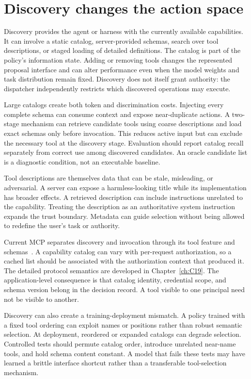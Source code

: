 \section{Discovery changes the action space}\label{sec:C18:discovery}
Discovery provides the agent or harness with the currently available capabilities. It can involve a static catalog, server-provided schemas, search over tool descriptions, or staged loading of detailed definitions. The catalog is part of the policy's information state. Adding or removing tools changes the represented proposal interface and can alter performance even when the model weights and task distribution remain fixed. Discovery does not itself grant authority: the dispatcher independently restricts which discovered operations may execute.

Large catalogs create both token and discrimination costs. Injecting every complete schema can consume context and expose near-duplicate actions. A two-stage mechanism can retrieve candidate tools using coarse descriptions and load exact schemas only before invocation. This reduces active input but can exclude the necessary tool at the discovery stage. Evaluation should report catalog recall separately from correct use among discovered candidates. An oracle candidate list is a diagnostic condition, not an executable baseline.

Tool descriptions are themselves data that can be stale, misleading, or adversarial. A server can expose a harmless-looking title while its implementation has broader effects. A retrieved description can include instructions unrelated to the capability. Treating the description as an authoritative system instruction expands the trust boundary. Metadata can guide selection without being allowed to redefine the user's task or authority.

Current MCP separates discovery and invocation through its tool feature and schemas~\cite{mcp2026tools}. A capability catalog can vary with per-request authorization, so a cached list should be associated with the authorization context that produced it. The detailed protocol semantics are developed in Chapter~\ref{ch:C19}. The application-level consequence is that catalog identity, credential scope, and schema version belong in the decision record. A tool visible to one principal need not be visible to another.

Discovery can also create a training-deployment mismatch. A policy trained with a fixed tool ordering can exploit names or positions rather than robust semantic selection. At deployment, reordered or expanded catalogs can degrade selection. Controlled tests should permute catalog order, introduce unrelated near-name tools, and hold schema content constant. A model that fails these tests may have learned a brittle interface shortcut rather than a transferable tool-selection mechanism.

